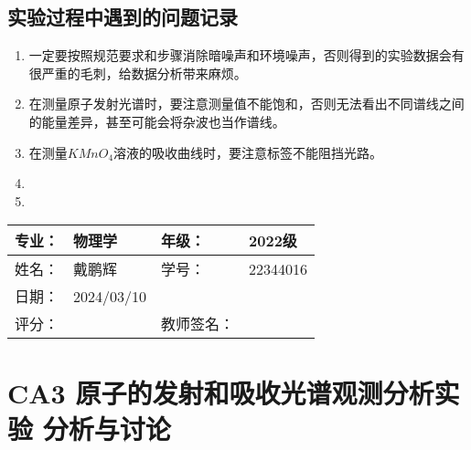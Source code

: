 \documentclass[dvipsnames, svgnames,a4paper,11pt]{article}
\begin{document}
	
	








\subsection{实验过程中遇到的问题记录}

\begin{enumerate}
	\item 一定要按照规范要求和步骤消除暗噪声和环境噪声，否则得到的实验数据会有很严重的毛刺，给数据分析带来麻烦。
	
	\item 在测量原子发射光谱时，要注意测量值不能饱和，否则无法看出不同谱线之间的能量差异，甚至可能会将杂波也当作谱线。
	
	\item 在测量$KMnO_4$溶液的吸收曲线时，要注意标签不能阻挡光路。
	
	\item 	
	
	\item 	
	
\end{enumerate}
	

\clearpage
\begin{table}
	\renewcommand\arraystretch{1.7}
	\begin{tabularx}{\textwidth}{|X|X|X|X|}
	\hline
	专业：& 物理学 &年级：& 2022级\\
	\hline
	姓名： & 戴鹏辉 & 学号：& 22344016\\
	\hline
    日期：& 2024/03/10 &  &\\
	\hline
	评分： &      & 教师签名：&   \\
	\hline
	\end{tabularx}
\end{table}

\section{CA3 \quad 原子的发射和吸收光谱观测分析实验 \quad\heiti 分析与讨论}
\end{document}
